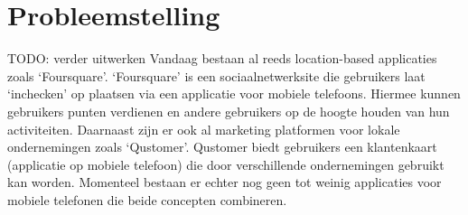 \chapter{Probleemstelling}
TODO: verder uitwerken
Vandaag bestaan al reeds location-based applicaties zoals ‘Foursquare’. ‘Foursquare’ is een sociaalnetwerksite die gebruikers laat ‘inchecken’ op plaatsen via een applicatie voor mobiele telefoons. Hiermee kunnen gebruikers punten verdienen en andere gebruikers op de hoogte houden van hun activiteiten. Daarnaast zijn er ook al marketing platformen voor lokale ondernemingen zoals ‘Qustomer’. Qustomer biedt gebruikers een klantenkaart (applicatie op mobiele telefoon) die door verschillende ondernemingen gebruikt kan worden. Momenteel bestaan er echter nog geen tot weinig applicaties voor mobiele telefonen die beide concepten combineren.


